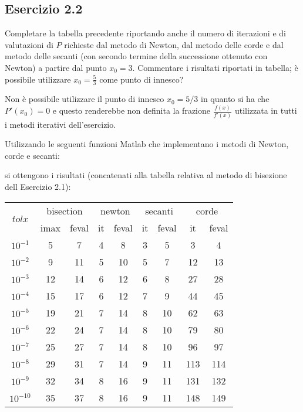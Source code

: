 	\subsection{Esercizio 2.2}
	
Completare la tabella precedente riportando anche il numero di iterazioni e di valutazioni di $P$ richieste dal metodo di Newton, dal metodo delle corde e dal metodo delle secanti (con secondo termine della successione ottenuto con Newton) a partire dal punto $x_0=3$. Commentare i risultati riportati in tabella; è possibile utilizzare $x_0 = \frac{5}{3}$ come punto di innesco?

Non è possibile utilizzare il punto di innesco $x_0 = 5/3$ in quanto si ha che $P'(x_0) = 0$ e questo renderebbe non definita la frazione $\frac{f(x)}{f'(x)}$ utilizzata in tutti i metodi iterativi dell'esercizio.

Utilizzando le seguenti funzioni Matlab che implementano i metodi di Newton, corde e secanti:


si ottengono i risultati  (concatenati alla tabella relativa al metodo di bisezione dell Esercizio 2.1):
\begin{tabular}{ c | c | c | c | c | c | c | c | c }

\multirow{2}{*}{$tolx$} & \multicolumn{2}{c}{bisection} & \multicolumn{2}{c}{newton} & \multicolumn{2}{c}{secanti} & \multicolumn{2}{c}{corde} \\
\cline{2-9}
 & imax & feval & it & feval & it & feval & it & feval\\
\hline
$10^{-1}$ & 5 & 7 		& 4 & 8   & 3 &  5 & 3   & 4  \\
$10^{-2}$ & 9 & 11 	&   5 & 10  & 5 &  7 & 12  & 13 \\
$10^{-3}$ & 12 & 14 	& 6 & 12  & 6 &  8 & 27  & 28 \\
$10^{-4}$ & 15 & 17 	& 6 & 12  & 7 &  9 & 44  & 45 \\
$10^{-5}$ & 19 & 21 	& 7 & 14  & 8 & 10 & 62  & 63 \\
$10^{-6}$ & 22 & 24 	& 7 & 14  & 8 & 10 & 79  & 80 \\
$10^{-7}$ & 25 & 27   &  7 & 14  & 8 & 10 & 96  & 97 \\
$10^{-8}$ & 29 & 31 	& 7 & 14  & 9 & 11 & 113 & 114\\
$10^{-9}$ & 32 & 34 	& 8 & 16  & 9 & 11 & 131 & 132\\
$10^{-10}$ & 35 & 37	& 8 & 16  & 9 & 11 & 148 & 149\\
\end{tabular}

